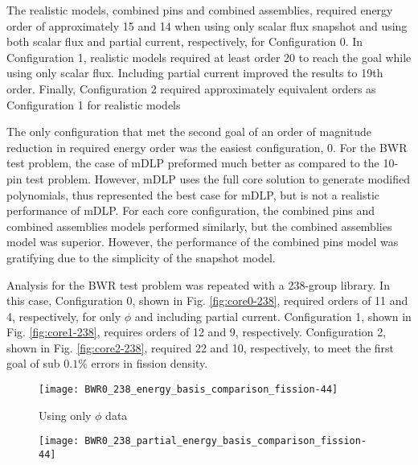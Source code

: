 \documentclass[5p,times,twocolumn,10pt]{elsarticle}
\begin{document}
  The realistic models, combined pins and combined assemblies, required energy order of approximately 15 and 14 when using only 
  scalar flux snapshot and using both scalar flux and partial current, respectively, for Configuration 0.  In Configuration 1,
  realistic models required at least order 20 to reach the goal while using only scalar flux.  Including partial current
  improved the results to 19th order.  Finally, Configuration 2 required approximately equivalent orders as Configuration 1 for realistic models
  
  The only configuration that met the second goal of an order of magnitude reduction in required energy order was the easiest configuration, 0.
  For the BWR test problem, the case of mDLP preformed much better as compared to the 10-pin test problem.
  However, mDLP uses the full core solution to generate modified polynomials, thus represented the best case for mDLP, but is not a realistic performance of mDLP.  
  For each core configuration, the combined pins and combined assemblies models performed similarly, but the combined assemblies model was superior.
  However, the performance of the combined pins model was gratifying due to the simplicity of the snapshot model.
  
  Analysis for the BWR test problem was repeated with a 238-group library.  In this case, Configuration 0, shown in Fig. \ref{fig:core0-238},
  required orders of 11 and 4, respectively, for only $\phi$ and including partial current.  Configuration 1, shown in Fig. \ref{fig:core1-238},
  requires orders of 12 and 9, respectively.  Configuration 2, shown in Fig. \ref{fig:core2-238}, required 22 and 10, respectively, 
  to meet the first goal of sub $0.1\%$ errors in fission density.
  
  \begin{figure*}[!ht]
    \centering
    \begin{subfigure}{0.5\textwidth}
      \centering
      \texttt{[image: BWR0\_238\_energy\_basis\_comparison\_fission-44]}
      \caption{Using only $\phi$ data}
      \label{fig:core0-238a}
    \end{subfigure}%
    \begin{subfigure}{0.5\textwidth}
      \centering
      \texttt{[image: BWR0\_238\_partial\_energy\_basis\_comparison\_fission-44]}
      \label{fig:core0-238b} 
    \end{subfigure}
    \caption{Relative error for BWR test problem, Configuration 0, from 238-group library}
    \label{fig:core0-238}
  \end{figure*}
  
\end{document}
